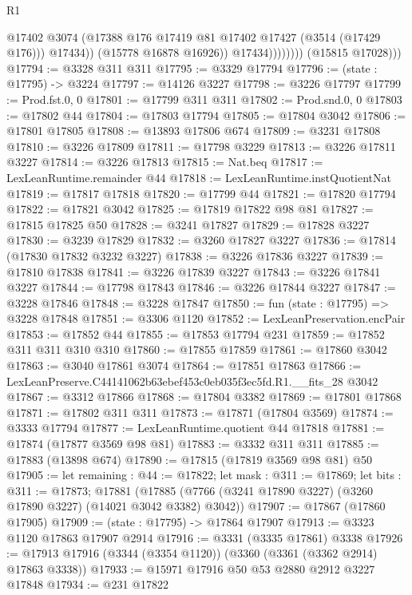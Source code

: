 \begin{lexlean}{R1}
\begin{coremodule}
                              @17402
                              @3074
                              (@17388 @176 @17419 @81 @17402 @17427 (@3514 (@17429 @176)))
                              @17434))
                          (@15778 @16878 @16926))
                        @17434))))))))
        (@15815 @17028)))
@17794 := @3328 @311 @311
@17795 := @3329 @17794
@17796 := (state : @17795) -> @3224
@17797 := @14126 @3227
@17798 := @3226 @17797
@17799 := Prod.fst.{0, 0}
@17801 := @17799 @311 @311
@17802 := Prod.snd.{0, 0}
@17803 := @17802 @44
@17804 := @17803 @17794
@17805 := @17804 @3042
@17806 := @17801 @17805
@17808 := @13893 @17806 @674
@17809 := @3231 @17808
@17810 := @3226 @17809
@17811 := @17798 @3229
@17813 := @3226 @17811 @3227
@17814 := @3226 @17813
@17815 := Nat.beq
@17817 := LexLeanRuntime.remainder @44
@17818 := LexLeanRuntime.instQuotientNat
@17819 := @17817 @17818
@17820 := @17799 @44
@17821 := @17820 @17794
@17822 := @17821 @3042
@17825 := @17819 @17822 @98 @81
@17827 := @17815 @17825 @50
@17828 := @3241 @17827
@17829 := @17828 @3227
@17830 := @3239 @17829
@17832 := @3260 @17827 @3227
@17836 := @17814 (@17830 @17832 @3232 @3227)
@17838 := @3226 @17836 @3227
@17839 := @17810 @17838
@17841 := @3226 @17839 @3227
@17843 := @3226 @17841 @3227
@17844 := @17798 @17843
@17846 := @3226 @17844 @3227
@17847 := @3228 @17846
@17848 := @3228 @17847
@17850 := fun (state : @17795) => @3228 @17848
@17851 := @3306 @1120
@17852 := LexLeanPreservation.encPair
@17853 := @17852 @44
@17855 := @17853 @17794 @231
@17859 := @17852 @311 @311 @310 @310
@17860 := @17855 @17859
@17861 := @17860 @3042
@17863 := @3040 @17861 @3074
@17864 := @17851 @17863
@17866 := LexLeanPreserve.C44141062b63ebef453c0eb035f3ec5fd.R1.__fits_28 @3042
@17867 := @3312 @17866
@17868 := @17804 @3382
@17869 := @17801 @17868
@17871 := @17802 @311 @311
@17873 := @17871 (@17804 @3569)
@17874 := @3333 @17794
@17877 := LexLeanRuntime.quotient @44 @17818
@17881 := @17874 (@17877 @3569 @98 @81)
@17883 := @3332 @311 @311
@17885 := @17883 (@13898 @674)
@17890 := @17815 (@17819 @3569 @98 @81) @50
@17905 := let remaining : @44 := @17822;
  let mask : @311 := @17869;
  let bits : @311 := @17873;
  @17881 (@17885 (@7766 (@3241 @17890 @3227) (@3260 @17890 @3227) (@14021 @3042 @3382) @3042))
@17907 := @17867 (@17860 @17905)
@17909 := (state : @17795) -> @17864 @17907
@17913 := @3323 @1120 @17863 @17907 @2914
@17916 := @3331 (@3335 @17861) @3338
@17926 := @17913 @17916 (@3344 (@3354 @1120)) (@3360 (@3361 (@3362 @2914) @17863 @3338))
@17933 := @15971 @17916 @50 @53 @2880 @2912 @3227 @17848
@17934 := @231 @17822

\end{coremodule}
\end{lexlean}
